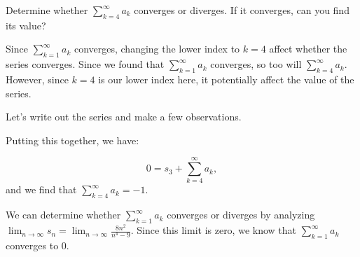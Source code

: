 \documentclass{ximera}
\begin{document}
\begin{example}
\begin{question}
Determine whether $\sum_{k=4}^{\infty} a_k$ converges or diverges.  If it converges, can you find its value?

\begin{explanation}
Since $\sum_{k=1}^{\infty} a_k$ converges, changing the lower index to $k=4$   affect whether the series converges.  Since we found that $\sum_{k=1}^{\infty} a_k$ converges, so too will $\sum_{k=4}^{\infty} a_k$.  However, since $k=4$ is our lower index here, it  potentially affect the value of the series.

Let's write out the series and make a few observations.

\begin{image}
  \end{image}
  
 Putting this together, we have:
 
 \[
 0 = s_3 + \sum_{k=4}^{\infty} a_k,
 \] 
 and we find that $ \sum_{k=4}^{\infty} a_k = -1$. 

We can determine whether $\sum_{k=1}^{\infty} a_k$ converges or diverges by analyzing $\lim_{n \to \infty} s_n = \lim_{n \to \infty} \frac{8n^2}{n^4-9}$.  Since this limit is zero, we know that $\sum_{k=1}^{\infty} a_k$ converges to $0$.
\end{explanation}
\end{question}

\end{example}
\end{document}
